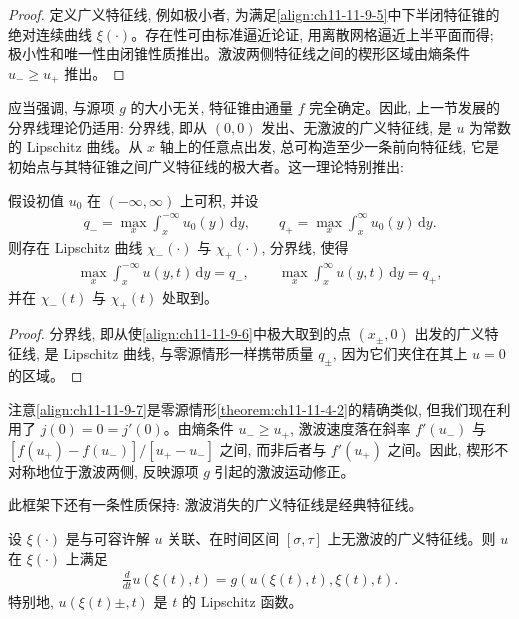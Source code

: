 \documentclass[../../main.tex]{subfiles}
\begin{document}
\begin{proof}
定义广义特征线, 例如极小者, 为满足\eqref{align:ch11-11-9-5}中下半闭特征锥的绝对连续曲线 $\xi(\cdot)$。存在性可由标准逼近论证, 用离散网格逼近上半平面而得; 极小性和唯一性由闭锥性质推出。激波两侧特征线之间的楔形区域由熵条件 $u_-\geqslant u_+$ 推出。
\end{proof}

应当强调, 与源项 $g$ 的大小无关, 特征锥由通量 $f$ 完全确定。因此, 上一节发展的分界线理论仍适用: 分界线, 即从 $(0,0)$ 发出、无激波的广义特征线, 是 $u$ 为常数的 Lipschitz 曲线。从 $x$ 轴上的任意点出发, 总可构造至少一条前向特征线, 它是初始点与其特征锥之间广义特征线的极大者。这一理论特别推出:

\begin{theorem}\label{theorem:ch11-11-9-2}
假设初值 $u_0$ 在 $(-\infty,\infty)$ 上可积, 并设
\begin{align}
q_-=\max_x\int_x^{-\infty}u_0(y)\,\mathrm{d}y,\qquad q_+=\max_x\int_x^\infty u_0(y)\,\mathrm{d}y.\label{align:ch11-11-9-6}
\end{align}
则存在 Lipschitz 曲线 $\chi_-(\cdot)$ 与 $\chi_+(\cdot)$, 分界线, 使得
\begin{align}
\max_x\int_x^{-\infty}u(y,t)\,\mathrm{d}y=q_-,\qquad
\max_x\int_x^\infty u(y,t)\,\mathrm{d}y=q_+,\label{align:ch11-11-9-7}
\end{align}
并在 $\chi_-(t)$ 与 $\chi_+(t)$ 处取到。
\end{theorem}

\begin{proof}
分界线, 即从使\eqref{align:ch11-11-9-6}中极大取到的点 $(x_\pm,0)$ 出发的广义特征线, 是 Lipschitz 曲线, 与零源情形一样携带质量 $q_\pm$, 因为它们夹住在其上 $u=0$ 的区域。
\end{proof}

注意\eqref{align:ch11-11-9-7}是零源情形\cref{theorem:ch11-11-4-2}的精确类似, 但我们现在利用了 $j(0)=0=j'(0)$。由熵条件 $u_-\geqslant u_+$, 激波速度落在斜率 $f'(u_-)$ 与 $[f(u_+)-f(u_-)]/[u_+-u_-]$ 之间, 而非后者与 $f'(u_+)$ 之间。因此, 楔形不对称地位于激波两侧, 反映源项 $g$ 引起的激波运动修正。

此框架下还有一条性质保持: 激波消失的广义特征线是经典特征线。

\begin{theorem}\label{theorem:ch11-11-9-3}
设 $\xi(\cdot)$ 是与可容许解 $u$ 关联、在时间区间 $[\sigma,\tau]$ 上无激波的广义特征线。则 $u$ 在 $\xi(\cdot)$ 上满足
\begin{align}
\frac{d}{dt}u(\xi(t),t)=g(u(\xi(t),t),\xi(t),t).\label{align:ch11-11-9-8}
\end{align}
特别地, $u(\xi(t)\pm,t)$ 是 $t$ 的 Lipschitz 函数。
\end{theorem}
\end{document}

